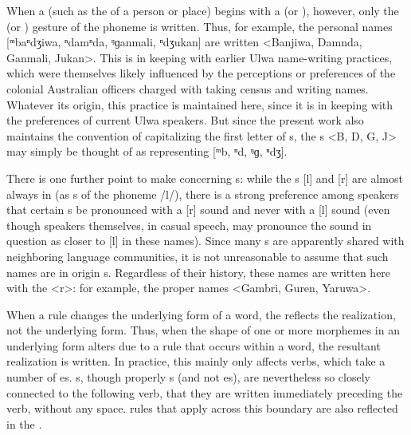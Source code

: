   When a  (such as the  of a person or place) begins with a   (or ), however, only the  (or ) gesture of the phoneme is written. Thus, for example, the personal names [ᵐbaⁿdʒiwa, ⁿdamⁿda, ᵑɡanmali, ⁿdʒukan] are written <Banjiwa, Damnda, Ganmali, Jukan>. This is in keeping with earlier Ulwa name-writing practices, which were themselves likely influenced by the perceptions or preferences of the colonial Australian officers charged with taking census and writing names. Whatever its origin, this practice is maintained here, since it is in keeping with the preferences of current Ulwa speakers. But since the present work also maintains the convention of capitalizing the first letter of s, the s <B, D, G, J> may simply be thought of as representing [ᵐb, ⁿd, ᵑɡ, ⁿdʒ].


There is one further point to make concerning s: while the s [l] and [r] are almost always in  (as s of the phoneme /l/), there is a strong preference among speakers that certain s be pronounced with a  [r] sound and never with a  [l] sound (even though speakers themselves, in casual speech, may pronounce the sound in question as closer to [l] in these names). Since many s are apparently shared with neighboring language communities, it is not unreasonable to assume that such names are in origin s. Regardless of their history, these names are written here with the  <r>: for example, the proper names <Gambri, Guren, Yaruwa>.

When a  rule changes the underlying form of a word, the  reflects the  realization, not the underlying form. Thus, when the shape of one or more morphemes in an underlying form alters due to a  rule that occurs within a  word, the resultant  realization is written. In practice, this mainly only affects verbs, which take a number of  es. s, though properly s (and not es), are nevertheless so closely connected to the following verb, that they are written immediately preceding the verb, without any space.  rules that apply across this  boundary are also reflected in the .

